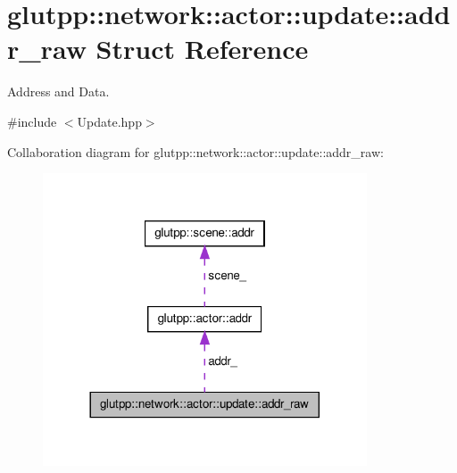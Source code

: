 \hypertarget{structglutpp_1_1network_1_1actor_1_1update_1_1addr__raw}{\section{glutpp\-:\-:network\-:\-:actor\-:\-:update\-:\-:addr\-\_\-raw \-Struct \-Reference}
\label{structglutpp_1_1network_1_1actor_1_1update_1_1addr__raw}
}


\-Address and \-Data.  




{\ttfamily \#include $<$\-Update.\-hpp$>$}



\-Collaboration diagram for glutpp\-:\-:network\-:\-:actor\-:\-:update\-:\-:addr\-\_\-raw\-:\nopagebreak
\begin{figure}[H]
\begin{center}
\leavevmode
\includegraphics[width=272pt]{structglutpp_1_1network_1_1actor_1_1update_1_1addr__raw__coll__graph}
\end{center}
\end{figure}

